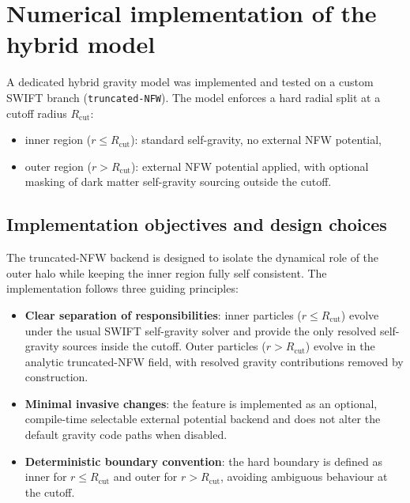 \section{Numerical implementation of the hybrid model}
\label{sec:framework_hybrid}

A dedicated hybrid gravity model was implemented and tested on a custom SWIFT branch (\texttt{truncated-NFW}). The model enforces a hard radial split at a cutoff radius $R_{\mathrm{cut}}$:
\begin{itemize}
\item inner region ($r \le R_{\mathrm{cut}}$): standard self-gravity, no external NFW potential,
\item outer region ($r > R_{\mathrm{cut}}$): external NFW potential applied, with optional masking of dark matter self-gravity sourcing outside the cutoff.
\end{itemize}

\subsection{Implementation objectives and design choices}

The truncated-NFW backend is designed to isolate the dynamical role of the outer halo while keeping the inner region fully self consistent. The implementation follows three guiding principles:

\begin{itemize}
\item \textbf{Clear separation of responsibilities}: inner particles (\(r\le R_{\mathrm{cut}}\)) evolve under the usual SWIFT self-gravity solver and provide the only resolved self-gravity sources inside the cutoff. Outer particles (\(r>R_{\mathrm{cut}}\)) evolve in the analytic truncated-NFW field, with resolved gravity contributions removed by construction.
\item \textbf{Minimal invasive changes}: the feature is implemented as an optional, compile-time selectable external potential backend and does not alter the default gravity code paths when disabled.
\item \textbf{Deterministic boundary convention}: the hard boundary is defined as inner for \(r\le R_{\mathrm{cut}}\) and outer for \(r>R_{\mathrm{cut}}\), avoiding ambiguous behaviour at the cutoff.
\end{itemize}



